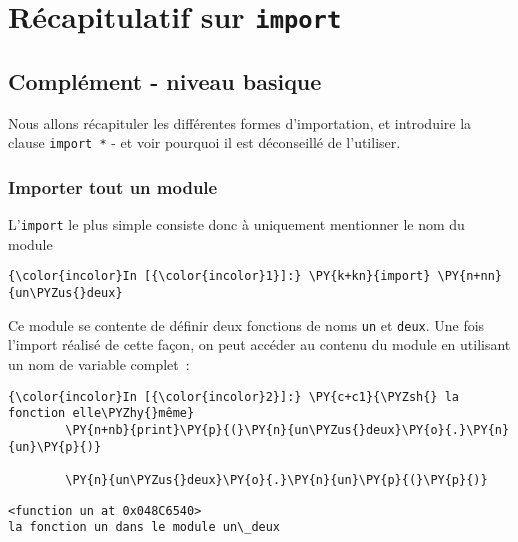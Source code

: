     \hypertarget{ruxe9capitulatif-sur-import}{%
\section{\texorpdfstring{Récapitulatif sur
\texttt{import}}{Récapitulatif sur import}}\label{ruxe9capitulatif-sur-import}}

    \hypertarget{compluxe9ment---niveau-basique}{%
\subsection{Complément - niveau
basique}\label{compluxe9ment---niveau-basique}}

    Nous allons récapituler les différentes formes d'importation, et
introduire la clause \texttt{import\ *} - et voir pourquoi il est
déconseillé de l'utiliser.

    \hypertarget{importer-tout-un-module}{%
\subsubsection{Importer tout un module}\label{importer-tout-un-module}}

    L'\texttt{import} le plus simple consiste donc à uniquement mentionner
le nom du module

    \begin{Verbatim}[commandchars=\\\{\}]
{\color{incolor}In [{\color{incolor}1}]:} \PY{k+kn}{import} \PY{n+nn}{un\PYZus{}deux}
\end{Verbatim}


    Ce module se contente de définir deux fonctions de noms \texttt{un} et
\texttt{deux}. Une fois l'import réalisé de cette façon, on peut accéder
au contenu du module en utilisant un nom de variable complet~:

    \begin{Verbatim}[commandchars=\\\{\}]
{\color{incolor}In [{\color{incolor}2}]:} \PY{c+c1}{\PYZsh{} la fonction elle\PYZhy{}même}
        \PY{n+nb}{print}\PY{p}{(}\PY{n}{un\PYZus{}deux}\PY{o}{.}\PY{n}{un}\PY{p}{)}
        
        \PY{n}{un\PYZus{}deux}\PY{o}{.}\PY{n}{un}\PY{p}{(}\PY{p}{)}
\end{Verbatim}


    \begin{Verbatim}[commandchars=\\\{\}]
<function un at 0x048C6540>
la fonction un dans le module un\_deux

    \end{Verbatim}


